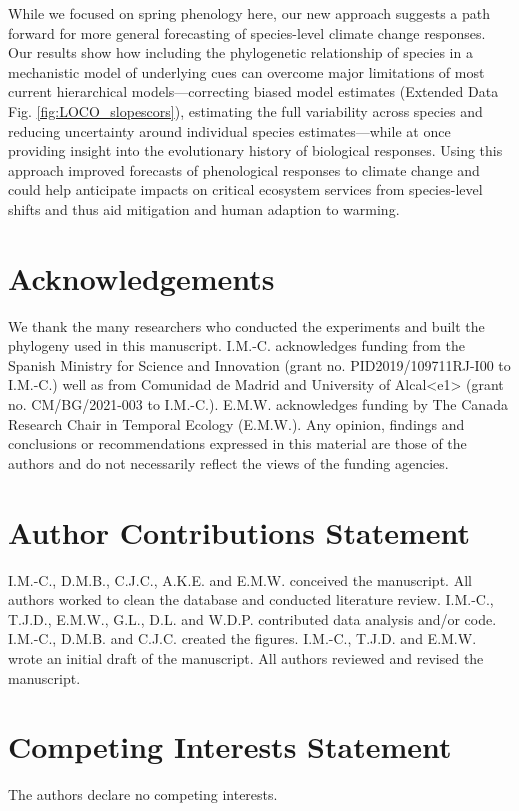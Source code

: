\documentclass{article}
\begin{document}
While we focused on spring phenology here, our new approach suggests a path forward for more general forecasting of species-level climate change responses. Our results show how including the phylogenetic relationship of species in a mechanistic model of underlying cues can overcome major limitations of most current hierarchical models---correcting biased model estimates (Extended Data Fig. \ref{fig:LOCO_slopescors}), estimating the full variability across species and reducing uncertainty around individual species estimates---while at once providing insight into the evolutionary history of biological responses. Using this approach improved forecasts of phenological responses to climate change and could help anticipate impacts on critical ecosystem services from species-level shifts and thus aid mitigation and human adaption to warming. 


\section*{Acknowledgements}
We thank the many researchers who conducted the experiments and built the phylogeny used in this manuscript. I.M.-C. acknowledges funding from the Spanish Ministry for Science and Innovation (grant no. PID2019/109711RJ-I00 to I.M.-C.) well as from Comunidad de Madrid and University of Alcal<e1> (grant no. CM/BG/2021-003 to I.M.-C.). E.M.W. acknowledges funding by The Canada Research Chair in Temporal Ecology (E.M.W.). Any opinion, findings and conclusions or recommendations expressed in this material are those of the authors and do not necessarily reflect the views of the funding agencies.

\section*{Author Contributions Statement}
I.M.-C., D.M.B., C.J.C., A.K.E. and E.M.W. conceived the manuscript. All authors worked to clean the database and conducted literature review. I.M.-C., T.J.D., E.M.W., G.L., D.L. and W.D.P. contributed data analysis and/or code. I.M.-C., D.M.B. and C.J.C. created the figures. I.M.-C., T.J.D. and E.M.W. wrote an initial draft of the manuscript. All authors reviewed and revised
the manuscript.

\section*{Competing Interests Statement}
The authors declare no competing interests.
\clearpage
\end{document}
